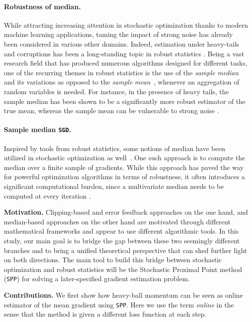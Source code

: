 \documentclass[10pt]{article} %
\newcommand{\SGD}{\texttt{SGD}}
\newcommand{\SPP}{\texttt{SPP}}
\begin{document}
\paragraph{Robustness of median.} While attracting increasing attention in stochastic optimization thanks to modern machine learning applications, taming the impact of strong noise has already been considered in various other domains. Indeed, estimation under heavy-tails and corruptions has been a long-standing topic in robust statistics \citep{Huber1981}. Being a vast research field that has produced numerous algorithms designed for different tasks, one of the recurring themes in robust statistics is the use of the \emph{sample median} and its  variations as opposed to the \emph{sample mean}~\citep{Minsker2015}, whenever an aggregation of random variables is needed. For instance, in the presence of heavy tails, the sample median has been shown to be a significantly more robust estimator of the true mean, whereas the sample mean can be vulnerable to strong noise \citep{Lugosi2019}.

\paragraph{Sample median \SGD{}.} Inspired by tools from robust statistics, some notions of median have been utilized in stochastic optimization as well~\citep{pmlr-v80-yin18a,Alistarh2018,pmlr-v151-acharya22a}.
One such approach is to compute the median over a finite sample of gradients. 
While this approach has paved the way for powerful optimization algorithms in terms of robustness, it often introduces a significant computational burden, since a multivariate median needs to be computed at every iteration \citep{Weiszfeld2009,Vardi2000}.


\textbf{Motivation.} Clipping-based and error feedback approaches on the one hand, and median-based approaches on the other hand are motivated through different mathematical frameworks and appear to use different algorithmic tools. In this study, our main goal is to bridge the gap between these two seemingly different branches and to bring a unified theoretical perspective that can shed further light on both directions. The main tool to build this bridge between stochastic optimization and robust statistics will be the Stochastic Proximal Point method (\SPP) \citep{Asi2019,Davis2019,Toulis2020} for solving a later-specified gradient estimation problem.   

\textbf{Contributions.} 
%
We first show how heavy-ball momentum \citep{Polyak1964} can be seen as online estimator of the mean gradient using \SPP{}. Here we use the term \emph{online} in the sense that the method is given a  different loss function at each step.
\end{document}
